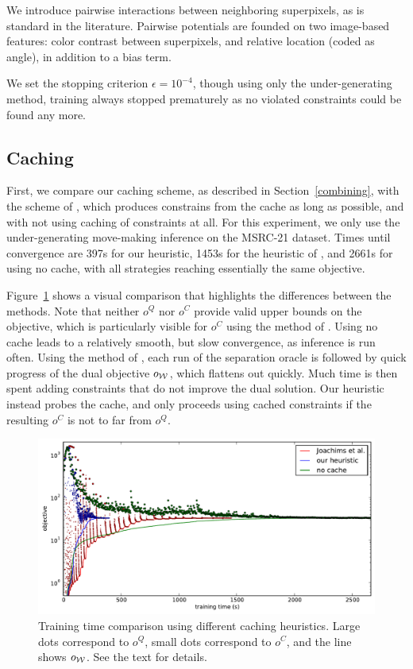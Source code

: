 We introduce pairwise interactions between neighboring superpixels, as is
standard in the literature. Pairwise potentials are founded on two
image-based features: color contrast between superpixels, and relative location
(coded as angle), in addition to a bias term.

We set the stopping criterion $\epsilon=10^{-4}$, though using only
the under-generating method, training always stopped prematurely as no violated
constraints could be found any more.

\subsection{Caching}
First, we compare our caching scheme, as described in Section~\ref{combining}, with the
scheme of \citet{joachims2009cutting}, which produces constrains from the cache
as long as possible, and with not using caching of constraints at all.  For this experiment,
we only use the under-generating move-making inference on the MSRC-21 dataset. Times until convergence
are 397s for our heuristic, 1453s for the heuristic of
\citet{joachims2009cutting}, and 2661s for using no cache, with all strategies
reaching essentially the same objective.

Figure~\ref{caching} shows a visual comparison that highlights the differences
between the methods. Note that neither $o^Q$ nor $o^C$ provide valid upper bounds on the objective,
which is particularly visible for $o^C$ using the method of \cite{joachims2009cutting}.
Using no cache leads to a relatively smooth, but slow convergence, as inference is run often.
Using the method of \citet{joachims2009cutting}, each run of the separation oracle is followed by
quick progress of the dual objective $o_{\mathcal{W}}$, which flattens out quickly. Much time is then spent adding
constraints that do not improve the dual solution.
Our heuristic instead probes the cache, and only proceeds using cached constraints if the resulting
$o^C$ is not to far from $o^Q$.

\begin{figure}
\centering
\includegraphics[width=\linewidth]{caching}
\caption{%
Training time comparison using different caching heuristics.
Large dots correspond to $o^Q$, small dots correspond to $o^C$,
and the line shows $o_{\mathcal{W}}$. See the text for details.\label{caching}}
\end{figure}


